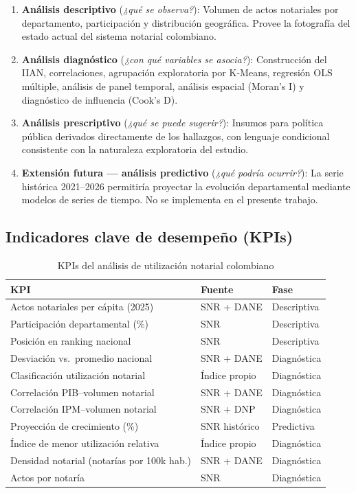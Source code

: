 \documentclass{article}
\begin{document}
\begin{enumerate}
    \item \textbf{Análisis descriptivo}
    (\textit{¿qué se observa?}): Volumen de actos notariales
    por departamento, participación y distribución geográfica.
    Provee la fotografía del estado actual del sistema notarial
    colombiano.

    \item \textbf{Análisis diagnóstico}
    (\textit{¿con qué variables se asocia?}): Construcción del IIAN,
    correlaciones, agrupación exploratoria por K-Means, regresión
    OLS múltiple, análisis de panel temporal, análisis espacial
    (Moran's I) y diagnóstico de influencia (Cook's D).

    \item \textbf{Análisis prescriptivo}
    (\textit{¿qué se puede sugerir?}): Insumos para política pública
    derivados directamente de los hallazgos, con lenguaje condicional
    consistente con la naturaleza exploratoria del estudio.

    \item \textbf{Extensión futura — análisis predictivo}
    (\textit{¿qué podría ocurrir?}): La serie histórica 2021--2026
    permitiría proyectar la evolución departamental mediante modelos
    de series de tiempo. No se implementa en el presente trabajo.
\end{enumerate}

\subsection{Indicadores clave de desempeño (KPIs)}

\begin{table}[H]
\centering
\begin{tabular}{lll}
\toprule
\textbf{KPI} & \textbf{Fuente} & \textbf{Fase} \\
\midrule
Actos notariales per cápita (2025) & SNR + DANE & Descriptiva \\
Participación departamental (\%) & SNR & Descriptiva \\
Posición en ranking nacional & SNR & Descriptiva \\
Desviación vs.\ promedio nacional & SNR + DANE & Diagnóstica \\
Clasificación utilización notarial & Índice propio & Diagnóstica \\
Correlación PIB--volumen notarial & SNR + DANE & Diagnóstica \\
Correlación IPM--volumen notarial & SNR + DNP & Diagnóstica \\
Proyección de crecimiento (\%) & SNR histórico & Predictiva \\
Índice de menor utilización relativa & Índice propio & Diagnóstica\\
Densidad notarial (notarías por 100k hab.) & SNR + DANE & Diagnóstica \\
Actos por notaría & SNR & Diagnóstica \\
\bottomrule
\end{tabular}
\caption{KPIs del análisis de utilización notarial colombiano}
\end{table}
\end{document}
